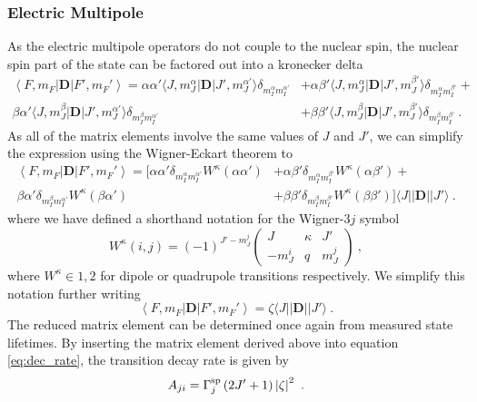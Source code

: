 \documentclass{article}
\begin{document}
\subsubsection{Electric Multipole}
As the electric multipole operators do not couple to the nuclear spin, the nuclear spin part of the state can be factored out into a kronecker delta 
\begin{equation}
\begin{split}
       \left\langle F, m_F\right|\mathbf{D}\left|F', m_F'\right\rangle = \alpha \alpha' \langle J,m_J^\alpha|\mathbf{D}|J', m_J^{\alpha'}\rangle \delta_{m_I^\alpha m_I^{\alpha'}} &+ \alpha \beta' \langle J,m_J^\alpha|\mathbf{D}|J', m_J^{\beta'}\rangle \delta_{m_I^\alpha m_I^{\beta'}} + \\ 
       \beta \alpha' \langle J,m_J^\beta|\mathbf{D}|J', m_J^{\alpha'}\rangle \delta_{m_I^\beta m_I^{\alpha'}} &+ \beta \beta' \langle J,m_J^\beta|\mathbf{D}|J', m_J^{\beta'}\rangle \delta_{m_I^\beta m_I^{\beta'}}~.
\end{split}
\end{equation}
As all of the matrix elements involve the same values of $J$ and $J'$, we can simplify the expression using the Wigner-Eckart theorem to
\begin{equation}
\begin{split}
       \left\langle F, m_F\right|\mathbf{D}\left|F', m_F'\right\rangle =  
       [ \alpha \alpha' \delta_{m_I^\alpha  m_I^{\alpha'}}  W^{\kappa}\left(\alpha \alpha'\right)  &+ \alpha \beta' \delta_{m_I^\alpha m_I^{\beta'}} 
       W^{\kappa}\left(\alpha \beta'\right) + \\
        \beta \alpha' \delta_{m_I^\beta m_I^{\alpha'}}
       W^{\kappa}\left(\beta \alpha'\right) &+ 
        \beta \beta' \delta_{m_I^\beta m_I^{\beta'}}
        W^{\kappa}\left(\beta \beta'\right) ] \langle J||\mathbf{D}||J'\rangle~.
\end{split}
\end{equation}
where we have defined a shorthand notation for the Wigner-$3j$ symbol
\begin{equation}
W^{\kappa}(i, j) = (-1)^{J'- m_J^{j}} \begin{pmatrix}
        J & \kappa & J'\\
        -m_J^i & q & m_J^{j}
        \end{pmatrix}~,
\end{equation}
where $W^{\kappa} \in 1,2$ for dipole or quadrupole transitions respectively. We simplify this notation further writing
\begin{equation}
    \left\langle F, m_F\right|\mathbf{D}\left|F', m_F'\right\rangle = \zeta \langle J||\mathbf{D}||J'\rangle~.  
\end{equation}
The reduced matrix element can be determined once again from measured state lifetimes. By inserting the matrix element derived above into equation \ref{eq:dec_rate}, the transition decay rate is given by 
\begin{equation}
    A_{ji} = \Gamma^{\rm{sp}}_j \left(2J'+1\right) \left|\zeta\right|^2~.
\end{equation}
\end{document}
